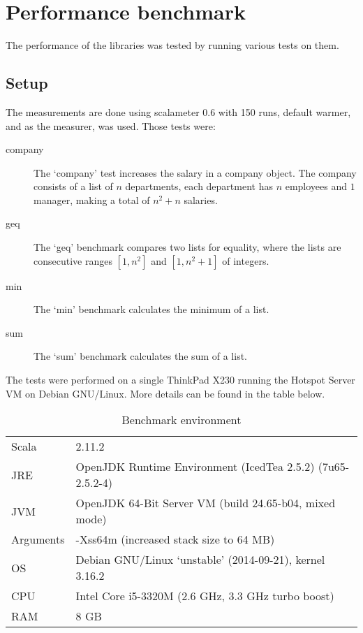 \section{Performance benchmark}
The performance of the libraries was tested by running various tests on them.
\subsection{Setup}
The measurements are done using scalameter 0.6 with 150 runs, default warmer,
and as the measurer, 
was used. Those tests were:
\begin{description}
    \item[company]The `company' test increases the salary in a company
object. The company consists of a list of $n$ departments, each department has
$n$ employees and $1$ manager, making a total of $n^{2} + n$ salaries.

    \item[geq] The `geq' benchmark compares two lists for equality, where the
               lists are consecutive ranges $[1, n^{2}]$ and $[1, n^{2} +1]$ of
               integers.

    \item[min] The `min' benchmark calculates the minimum of a list.

    \item[sum] The `sum' benchmark calculates the sum of a list.
\end{description}

The tests were performed on a single ThinkPad X230 running the Hotspot Server
VM on Debian GNU/Linux. More details can be found in the table below.

\begin{table}[b]
    \centering
\begin{tabular}{l|l}
    Scala & 2.11.2 \\
    JRE   & OpenJDK Runtime Environment (IcedTea 2.5.2) (7u65-2.5.2-4) \\
    JVM   & OpenJDK 64-Bit Server VM (build 24.65-b04, mixed mode) \\
    Arguments & -Xss64m (increased stack size to 64 MB) \\
    OS    & Debian GNU/Linux `unstable' (2014-09-21), kernel 3.16.2 \\\hline
    CPU   & Intel Core i5-3320M (2.6 GHz, 3.3 GHz turbo boost) \\
    RAM   & 8 GB
\end{tabular}
\caption{Benchmark environment}
\end{table}

